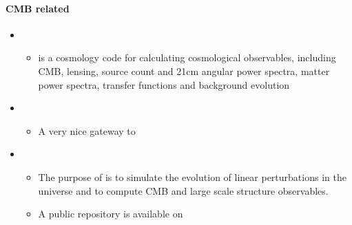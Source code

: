 \documentclass[letterpaper,10pt,english]{sphinxmanual}
\begin{document}
\paragraph{CMB related}
\label{\detokenize{resource/astro/topics/cosmology_tools:cmb-related}}\begin{itemize}
\item {} 
\begin{itemize}
\item {} 
 is a cosmology code for calculating cosmological
observables, including CMB, lensing, source count and 21cm angular
power spectra, matter power spectra, transfer functions and
background evolution

\end{itemize}

\item {} 
\begin{itemize}
\item {} 
A very nice gateway to 

\end{itemize}

\item {} 
\begin{itemize}
\item {} 
The purpose of  is to simulate the evolution of linear
perturbations in the universe and to compute CMB and large scale
structure observables.

\item {} 
A public repository is available on

\end{itemize}

\end{itemize}
\end{document}
